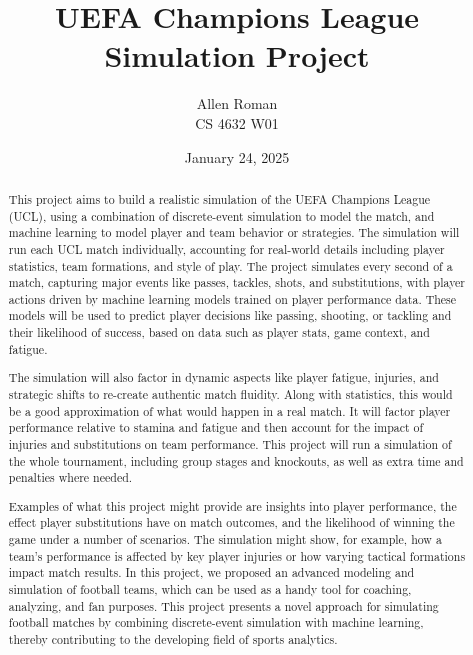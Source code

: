 \documentclass[12pt]{article}
\title{UEFA Champions League Simulation Project}
\author{Allen Roman \\ CS 4632 W01}
\date{January 24, 2025}
\begin{document}
\maketitle

\begin{abstract}
This project aims to build a realistic simulation of the UEFA Champions League (UCL), using a combination of discrete-event simulation to model the match, and machine learning to model player and team behavior or strategies. The simulation will run each UCL match individually, accounting for real-world details including player statistics, team formations, and style of play. The project simulates every second of a match, capturing major events like passes, tackles, shots, and substitutions, with player actions driven by machine learning models trained on player performance data. These models will be used to predict player decisions like passing, shooting, or tackling and their likelihood of success, based on data such as player stats, game context, and fatigue.

The simulation will also factor in dynamic aspects like player fatigue, injuries, and strategic shifts to re-create authentic match fluidity. Along with statistics, this would be a good approximation of what would happen in a real match. It will factor player performance relative to stamina and fatigue and then account for the impact of injuries and substitutions on team performance. This project will run a simulation of the whole tournament, including group stages and knockouts, as well as extra time and penalties where needed.

Examples of what this project might provide are insights into player performance, the effect player substitutions have on match outcomes, and the likelihood of winning the game under a number of scenarios. The simulation might show, for example, how a team’s performance is affected by key player injuries or how varying tactical formations impact match results. In this project, we proposed an advanced modeling and simulation of football teams, which can be used as a handy tool for coaching, analyzing, and fan purposes. This project presents a novel approach for simulating football matches by combining discrete-event simulation with machine learning, thereby contributing to the developing field of sports analytics.
\end{abstract}
\end{document}
